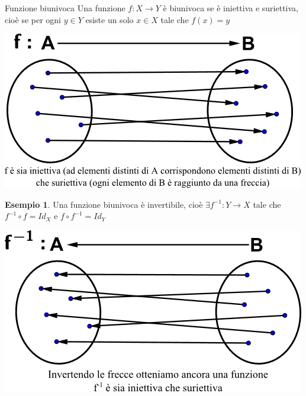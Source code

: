 \documentclass[a4paper]{article}
\theoremstyle{definition}
\newtheorem*{es}{Esempio}
\begin{document}
\begin{deff}{Funzione biunivoca}{}
	Una funzione $f: X \rightarrow Y$ è biunivoca se è iniettiva e suriettiva, cioè se per ogni $y \in Y$ esiste un solo $x \in X$ tale che $f(x) = y$
	\begin{center}
		\includegraphics{images/biunivoca_1.png}
	\end{center}
	\begin{es}
		Una funzione biunivoca è invertibile, cioè $\exists f^{-1}: Y \rightarrow X$ tale che $f^{-1} \circ f = Id_X$ e $f \circ f^{-1} = Id_Y$
	\end{es}
	\begin{center}
		\includegraphics{images/biunivoca_2.png}
	\end{center}
\end{deff}
\end{document}
